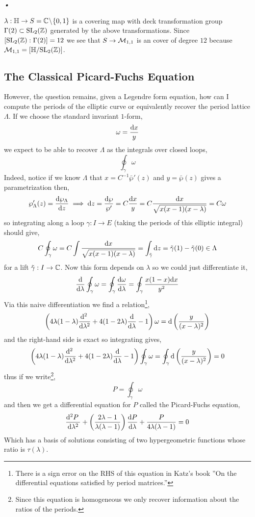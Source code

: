 \textit{•}\documentclass[12pt]{article}
\begin{document}
\begin{rmk}
$\lambda : \mathbb{H} \to S = \mathbb{C} \! \setminus \! \{ 0, 1 \}$ is a covering map with deck transformation group $\Gamma(2) \subset \mathrm{SL}_2(\mathbb{Z})$ generated by the above transformations. Since $[ \mathrm{SL}_2(\mathbb{Z}) : \Gamma(2)] = 12$ we see that $S \to \mathcal{M}_{1,1}$ is an \etale cover of degree $12$ because $\mathcal{M}_{1,1} = [\mathbb{H} / \mathrm{SL}_2(\mathbb{Z})]$.  
\end{rmk}


\subsection{The Classical Picard-Fuchs Equation}

However, the question remains, given a Legendre form equation, how can I compute the periods of the elliptic curve or equivalently recover the period lattice $\Lambda$. If we choose the standard invariant $1$-form,
\[ \omega = \frac{\mathrm{d}{x}}{y} \]
we expect to be able to recover $\Lambda$ as the integrals over closed loops,
\[ \oint_\gamma \omega \]
Indeed, notice if we know $\Lambda$ that $x = C^{-1} \bar{\wp}'(z)$ and $y = \bar{\wp}(z)$ gives a parametrization then,
\[ \wp'_{\Lambda}(z) = \frac{\mathrm{d}{\wp_\Lambda}}{\mathrm{d}{z}} \implies \mathrm{d}{z} = \frac{\mathrm{d}{\wp}}{\wp'} = C \frac{\mathrm{d}{x}}{y} = C \frac{\mathrm{d}{x}}{\sqrt{x(x-1)(x-\lambda)}} = C \omega \]
so integrating along a loop $\gamma : I \to E$ (taking the periods of this elliptic integral) should give,
\[ C \oint_\gamma \omega = C \int \frac{\mathrm{d}{x}}{\sqrt{x(x-1)(x-\lambda)}} = \int_{\tilde{\gamma}} \mathrm{d}{z} = \tilde{\gamma}(1) - \tilde{\gamma}(0) \in \Lambda \]
for a lift $\tilde{\gamma} : I \to \mathbb{C}$. Now this form depends on $\lambda$ so we could just differentiate it,
\[ \frac{\mathrm{d}{}}{\mathrm{d}{\lambda}} \oint_\gamma \omega = \oint_\gamma \frac{\mathrm{d}{\omega}}{\mathrm{d}{\lambda}} = \oint_{\gamma} \frac{x(1-x) \mathrm{d}{x}}{y^2} \]
Via this naive differentiation we find a relation\footnote{There is a sign error on the RHS of this equation in Katz's book ''On the differential equations satisfied by period matrices.''},
\[ \left( 4 \lambda(1 - \lambda) \frac{\mathrm{d}^{2}  \:}{\mathrm{d}{\lambda}^{2}} + 4 (1 - 2 \lambda) \frac{\mathrm{d}{}}{\mathrm{d}{\lambda}} - 1 \right) \omega = \mathrm{d} \left( \frac{y}{(x - \lambda)^2} \right) \]
and the right-hand side is exact so integrating gives,
\[ \left( 4 \lambda(1 - \lambda) \frac{\mathrm{d}^{2}  \:}{\mathrm{d}{\lambda}^{2}} + 4 (1 - 2 \lambda) \frac{\mathrm{d}{}}{\mathrm{d}{\lambda}} - 1 \right) \oint_\gamma  \omega = \oint_\gamma \mathrm{d} \left( \frac{y}{(x - \lambda)^2} \right) = 0 \] 
thus if we write\footnote{Since this equation is homogeneous we only recover information about the ratios of the periods.},
\[ P = \oint_\gamma \omega \]
and then we get a differential equation for $P$ called the Picard-Fuchs equation,
\[ \frac{\mathrm{d}^{2} P \:}{\mathrm{d}{\lambda}^{2}} + \left( \frac{2 \lambda - 1}{\lambda (\lambda - 1)} \right) \frac{\mathrm{d}{P}}{\mathrm{d}{\lambda}} + \frac{P}{4 \lambda(\lambda - 1)} = 0 \] 
Which has a basis of solutions consisting of two hypergeometric functions whose ratio is $\tau(\lambda)$. 
\end{document}
